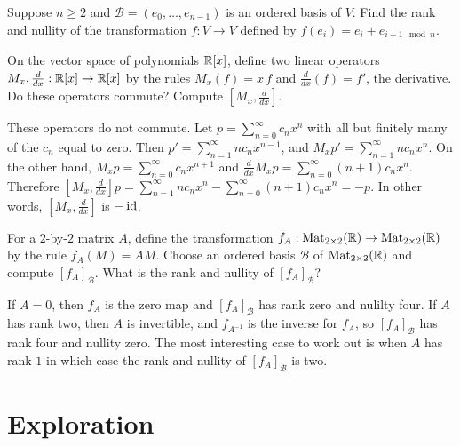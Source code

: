 \documentclass{homework}
\begin{document}
\begin{problem}
  Suppose $n \geq 2$ and $\mathcal{B} = (e_0,\ldots,e_{n-1})$ is an ordered basis of $V$.  Find the rank and nullity of the transformation $f : V \to V$ defined by $f(e_i) = e_i + e_{i+1 \mod n}$.
\end{problem}

\begin{problem}
  On the vector space of polynomials $\mathbb{R}[x]$, define two linear operators $M_x, \frac{d}{dx} : \mathbb{R}[x] \to \mathbb{R}[x]$ by the rules $M_x(f) = x \, f$ and $\frac{d}{dx}(f) = f'$, the derivative.  Do these operators commute?  Compute $[M_x,\frac{d}{dx}]$.
\end{problem}

\begin{solution}
  These operators do not commute.  Let $p = \sum_{n=0}^\infty c_n x^n$
  with all but finitely many of the $c_n$ equal to zero.  Then
  $p' = \sum_{n=1}^\infty n c_n x^{n-1}$, and $M_x p' = \sum_{n=1}^\infty n c_n x^{n}$.  On the other hand, $M_x p = \sum_{n=0}^\infty c_n x^{n+1}$ and $\frac{d}{dx} M_x p = \sum_{n=0}^\infty (n+1) c_n x^n$. Therefore $[M_x,\frac{d}{dx}] p = \sum_{n=1}^\infty n c_n x^{n} - \sum_{n=0}^\infty (n+1) c_n x^n = -p$.  In other words, $[M_x,\frac{d}{dx}]$ is $-\operatorname{id}$.
\end{solution}

\begin{problem}
  For a $2$-by-$2$ matrix $A$, define the transformation
  $f_A : \operatorname{Mat}_{2\times 2}(\mathbb{R}) \to \operatorname{Mat}_{2\times 2}(\mathbb{R})$ by the rule
  $f_A(M) = AM$.  Choose an ordered basis
  $\mathcal{B}$ of $\operatorname{Mat}_{2\times 2}(\mathbb{R})$ and compute
  $[f_A]_{\mathcal{B}}$.  What is the rank and nullity of $[f_A]_{\mathcal{B}}$?
\end{problem}

\begin{solution}
  If $A = 0$, then $f_A$ is the zero map and $[f_A]_{\mathcal{B}}$ has
  rank zero and nulilty four.  If $A$ has rank two, then $A$ is
  invertible, and $f_{A^{-1}}$ is the inverse for $f_A$, so
  $[f_A]_{\mathcal{B}}$ has rank four and nullity zero.  The most
  interesting case to work out is when $A$ has rank $1$ in which case
  the rank and nullity of $[f_A]_{\mathcal{B}}$ is two.
\end{solution}

\section{Exploration}
\end{document}
